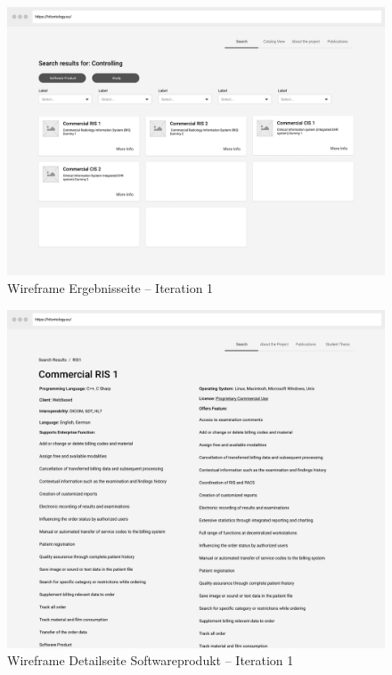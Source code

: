 \clearpage

\begin{figure}[ht]
	\centering
    	\includegraphics[width=1.4\textwidth, angle=90]{Images/Desktop_3}
   	\caption[Wireframe -- Ergebnisseite]{Wireframe Ergebnisseite -- Iteration 1}
\end{figure}

\clearpage

\begin{figure}[ht]
	\centering
    	\includegraphics[width=1\textwidth]{Images/Desktop_4}
   	\caption[Wireframe -- Detailseite Softwareprodukt]{Wireframe Detailseite Softwareprodukt -- Iteration 1}
\end{figure}
